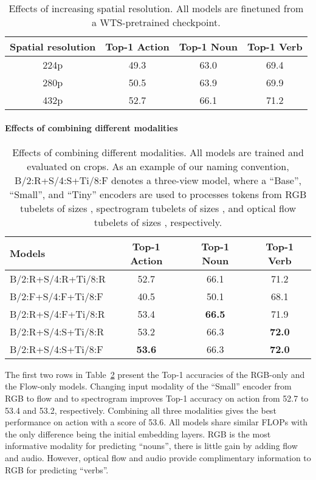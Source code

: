 \begin{table} 
	\centering
	\scriptsize{
\begin{tabular}{  c  c  c  c }
    \toprule
    Spatial resolution & Top-1 Action & Top-1 Noun & Top-1 Verb \\
    \midrule
    224p & 49.3 & 63.0 & 69.4 \\
    280p & 50.5 & 63.9 & 69.9 \\
    432p & 52.7 & 66.1 & 71.2 \\
    \bottomrule
   \end{tabular}
   }
	\caption{Effects of increasing spatial resolution. All models are finetuned from a WTS-pretrained checkpoint.}
\label{tab:resolution}
\end{table}
 
\paragraph{Effects of combining different modalities}
\begin{table} 
	\centering
	\scriptsize{
\begin{tabular}{  l  c  c  c }
    \toprule
    Models & Top-1 Action & Top-1 Noun & Top-1 Verb \\
    \midrule
    B/2:R+S/4:R+Ti/8:R & 52.7 & 66.1 & 71.2 \\
    B/2:F+S/4:F+Ti/8:F & 40.5 & 50.1 & 68.1 \\
    \midrule
    B/2:R+S/4:F+Ti/8:R & 53.4 & \bf{66.5} & 71.9 \\
    B/2:R+S/4:S+Ti/8:R & 53.2 & 66.3 & \bf{72.0} \\
    \midrule
    B/2:R+S/4:S+Ti/8:F & \bf{53.6} & 66.3 & \bf{72.0} \\
    \bottomrule
   \end{tabular}
   }
	\caption{Effects of combining different modalities. All models are trained and evaluated on  crops.
	As an example of our naming convention, B/2:R+S/4:S+Ti/8:F denotes a three-view model, where a ``Base'', ``Small'', and ``Tiny'' encoders are used to processes tokens from RGB tubelets of sizes , spectrogram tubelets of sizes , and optical flow tubelets of sizes , respectively.
}
\label{tab:modalities}
\end{table}
 The first two rows in Table~\ref{tab:modalities} present the Top-1 accuracies of the RGB-only and the Flow-only models. Changing input modality of the ``Small'' encoder from RGB to flow and to spectrogram improves Top-1 accuracy on action from 52.7 to 53.4 and 53.2, respectively. Combining all three modalities gives the best performance on action with a score of 53.6. All models share similar FLOPs with the only difference being the initial embedding layers. RGB is the most informative modality for predicting ``nouns'', there is little gain by adding flow and audio. 
However, optical flow and audio provide complimentary information to RGB for predicting ``verbs''.
 

